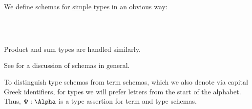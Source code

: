 \begin{definition}\label{def:simple_type_schema}
  We define schemas for \hyperref[def:simple_type]{simple types} in an obvious way:
  \begin{bnf*}
        {} \\
       {\bnftsq{(} \bnfsp {} \bnfsp \bnftsq{\( \synimplies \)} \bnfsp {} \bnfsp \bnftsq{)}} \\
             { \bnfor {} \bnfor {}}
  \end{bnf*}

  Product and sum types are handled similarly.
\end{definition}
\begin{comments}
  \item See  for a discussion of schemas in general.
  \item To distinguish type schemas from term schemas, which we also denote via capital Greek identifiers, for types we will prefer letters from the start of the alphabet. Thus, \( \Psi: \Alpha \) is a type assertion for term and type schemas.
\end{comments}

